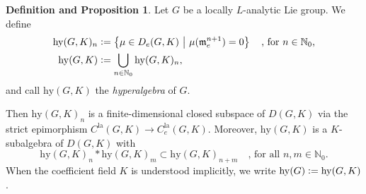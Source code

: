\documentclass[a4paper, reqno, 10pt]{amsart}
\theoremstyle{definition}
\newtheorem{definitionproposition}[theorem]{Definition and Proposition}
\numberwithin{equation}{section}
\newcommand{\defeq}{\vcentcolon=}
\newcommand{\hy}{{\mathrm{hy}}}
\newcommand{\la}{{\mathrm{la}}}
\newcommand{\ra}{\rightarrow}
\let\originalmiddle\middle
\renewcommand{\middle}[1]{\,\originalmiddle#1\,}
\newcommand{\BN}{{\mathbb {N}}}
\newcommand{\Fm}{{\mathfrak {m}}}
\begin{document}
\begin{definitionproposition}\label{Def 1 - Hyperalgebra}
	Let $G$ be a locally $L$-analytic Lie group.
	We define
	\begin{align*}
		\hy(G,K)_n &\defeq \left\{ \mu \in D_e(G,K) \middle{|} \mu (\Fm_e^{n+1}) =0\right\} \quad \text{, for $n\in \BN_0$,} \\
		\hy(G,K) &\defeq \bigcup_{n\in \BN_0} \hy(G,K)_n ,
	\end{align*}
	and call $\hy(G,K)$ the \textit{hyperalgebra} of $G$.
	
	Then $\hy(G,K)_n$ is a finite-dimensional closed subspace of $D(G,K)$ via the strict epimorphism $C^\la(G,K) \ra C^\la_e(G,K)$.
	Moreover, $\hy(G,K)$ is a $K$-subalgebra of $D(G,K)$ with 
	\begin{equation*}
		\hy(G,K)_n \ast \hy(G,K)_m \subset \hy(G,K)_{n+m} \quad \text{, for all $n,m\in \BN_0$.}
	\end{equation*}
	When the coefficient field $K$ is understood implicitly, we write $\hy(G)\defeq \hy(G,K)$.
\end{definitionproposition}
\end{document}
